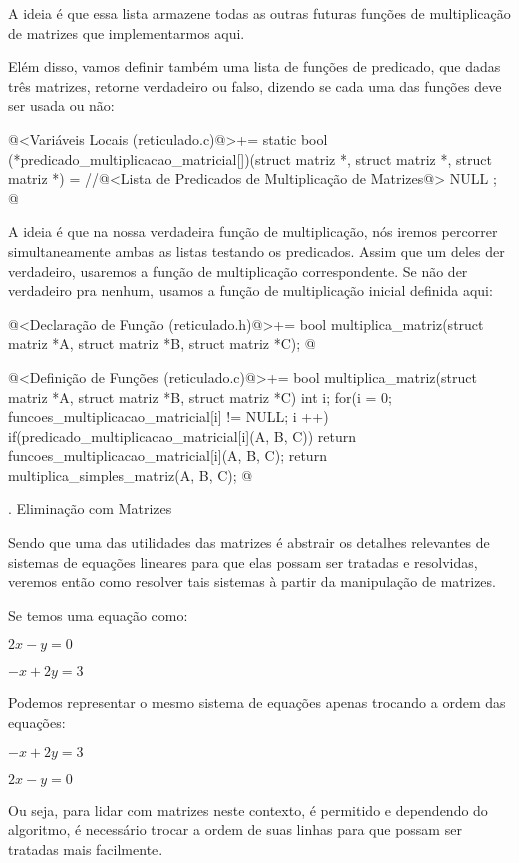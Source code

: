 A ideia é que essa lista armazene todas as outras futuras funções de
multiplicação de matrizes que implementarmos aqui.

Elém disso, vamos definir também uma lista de funções de predicado,
que dadas três matrizes, retorne verdadeiro ou falso, dizendo se cada
uma das funções deve ser usada ou não:

\iniciocodigo
@<Variáveis Locais (reticulado.c)@>+=
static bool (*predicado_multiplicacao_matricial[])(struct matriz *,
                                                  struct matriz *,
                                                  struct matriz *) =
  {
    //@<Lista de Predicados de Multiplicação de Matrizes@>
    NULL
  };
@
\fimcodigo

A ideia é que na nossa verdadeira função de multiplicação, nós iremos
percorrer simultaneamente ambas as listas testando os
predicados. Assim que um deles der verdadeiro, usaremos a função de
multiplicação correspondente. Se não der verdadeiro pra nenhum, usamos
a função de multiplicação inicial definida aqui:

\iniciocodigo
@<Declaração de Função (reticulado.h)@>+=
bool multiplica_matriz(struct matriz *A, struct matriz *B,
                        struct matriz *C);
@
\fimcodigo

\iniciocodigo
@<Definição de Funções (reticulado.c)@>+=
bool multiplica_matriz(struct matriz *A, struct matriz *B,
                       struct matriz *C){
  int i;
  for(i = 0; funcoes_multiplicacao_matricial[i] != NULL; i ++)
    if(predicado_multiplicacao_matricial[i](A, B, C))
      return funcoes_multiplicacao_matricial[i](A, B, C);
  return multiplica_simples_matriz(A, B, C);
}
@
\fimcodigo

{\tenbold{}. Eliminação com Matrizes}

Sendo que uma das utilidades das matrizes é abstrair os detalhes
relevantes de sistemas de equações lineares para que elas possam ser
tratadas e resolvidas, veremos então como resolver tais sistemas à
partir da manipulação de matrizes.

Se temos uma equação como:

$2x-y=0$

$-x+2y=3$

Podemos representar o mesmo sistema de equações apenas trocando a
ordem das equações:

$-x+2y=3$

$2x-y=0$

Ou seja, para lidar com matrizes neste contexto, é permitido e
dependendo do algoritmo, é necessário trocar a ordem de suas linhas
para que possam ser tratadas mais facilmente.

